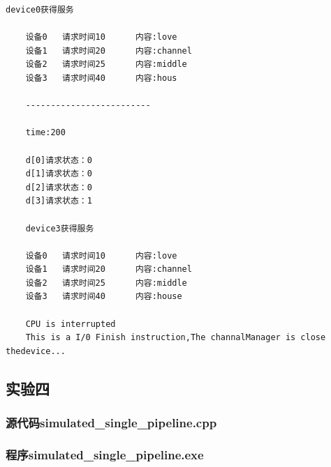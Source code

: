 \documentclass[UTF8,12pt]{article}
\begin{document}
\begin{lstlisting}[frame=shadowbox]
    device0获得服务
    
    设备0   请求时间10      内容:love
    设备1   请求时间20      内容:channel
    设备2   请求时间25      内容:middle
    设备3   请求时间40      内容:hous
    
    -------------------------
    
    time:200
    
    d[0]请求状态：0
    d[1]请求状态：0
    d[2]请求状态：0
    d[3]请求状态：1
    
    device3获得服务
    
    设备0   请求时间10      内容:love
    设备1   请求时间20      内容:channel
    设备2   请求时间25      内容:middle
    设备3   请求时间40      内容:house
    
    CPU is interrupted
    This is a I/0 Finish instruction,The channalManager is close thedevice...
\end{lstlisting}
\subsection{实验四}
\subsubsection{源代码simulated\_single\_pipeline.cpp}
\subsubsection{程序simulated\_single\_pipeline.exe}
\end{document}

